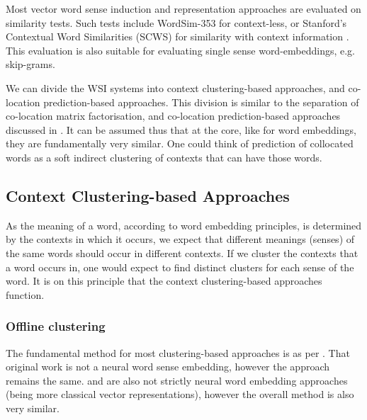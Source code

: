 \documentclass[12pt,parskip]{komatufte}
\begin{document}
Most vector word sense induction and representation approaches are evaluated on similarity tests.
Such tests include WordSim-353 \parencite{WordSim353} for context-less, or Stanford's Contextual Word Similarities (SCWS) for similarity with context information \parencite{Huang2012}.
This evaluation is also suitable for evaluating single sense word-embeddings, e.g. skip-grams.


We can divide the WSI systems into context clustering-based approaches,
and co-location prediction-based approaches.
This division is similar to the separation of co-location matrix factorisation,
and co-location prediction-based approaches discussed in .
It can be assumed thus that at the core, like for word embeddings,
they are fundamentally very similar.
One could think of prediction of collocated words as a soft indirect clustering of contexts that can have those words.


\subsection{Context Clustering-based Approaches}
As the meaning of a word, according to word embedding principles, is determined by the contexts in which it occurs,
we expect that different meanings (senses) of the same words should occur in different contexts.
If we cluster the contexts that a word occurs in, one would expect to find distinct clusters for each sense of the word.
It is on this principle that the context clustering-based approaches function.



\subsubsection{Offline clustering}\label{sec:offline-clustering}
The fundamental method for most clustering-based approaches is as per .
That original work is not a neural word sense embedding, however the approach remains the same.
 and  are also not strictly neural word embedding approaches (being more classical vector representations), however the overall method is also very similar.


\end{document}
